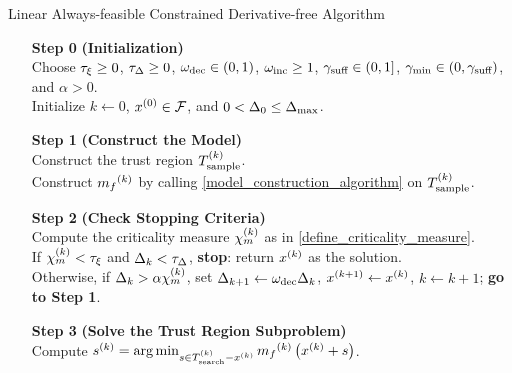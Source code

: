 \documentclass{article}
\begin{document}
{
\begin{fullwidth}[leftmargin=0in, rightmargin=0in, width=\linewidth-0.5in]
\begin{flushleft}

\begin{algorithm}[H]
    \caption{Linear Always-feasible Constrained Derivative-free Algorithm}
    \label{linearly_constrained_dfo_simple}
    \begin{itemize}
        \item[\textbf{Step 0}] \textbf{(Initialization)} \\
            Choose
            $\tau_{\xi}\ge 0$,
            $\tau_{\Delta} \ge 0$, 
            $\omega_{\text{dec}} \in (0,1)$, 
            $\omega_{\text{inc}} \ge 1$,  
            $ \gamma_{\textrm{suff}} \in (0,1]$, 
            $\gamma_{\textrm{min}} \in (0,\gamma_{\textrm{suff}})$,
			and $\alpha > 0$. \\
            Initialize
            $k\gets 0$,
            $x^{(0)} \in {\mathcal F}$,
            and $0 < \Delta_0 \le {\Delta_{\textrm{max}}}$.
            
        \item[\textbf{Step 1}] \textbf{(Construct the Model)} \\
           Construct the trust region ${T_{\text{sample}}^{(k)}}$. \\
           Construct ${{m}_f}^{(k)}$ by calling \cref{model_construction_algorithm} on ${T_{\text{sample}}^{(k)}}$.
        
        \item[\textbf{Step 2}] \textbf{(Check Stopping Criteria)} \\
            Compute the criticality measure ${\chi_m^{(k)}}$ as in \cref{define_criticality_measure}. \\
            If $ {\chi_m^{(k)}} < \tau_{\xi} $ and $\Delta_k <\tau_{\Delta}$,  {\bf stop}: return $x^{(k)}$ as the solution.   \\
            Otherwise, if $\Delta_k > \alpha {\chi_m^{(k)}}$,   
            set 
                $\Delta_{k+1} \gets \omega_{\text{dec}}\Delta_k$, 
                ${{x}^{(k+1)}} \gets x^{(k)}$,
                $k \gets k+1$; {\bf go to Step 1}.
           
        
        \item[\textbf{Step 3}] \textbf{(Solve the Trust Region Subproblem)} \\
            Compute ${{s}^{(k)}} = \operatorname*{arg\,min}_{s \in {T_{\text{search}}^{(k)}} - x^{(k)}} {{m}_f}^{(k)}\left(x^{(k)} + s\right)$. 
            

\end{itemize}
\end{algorithm}
\end{flushleft}
\end{fullwidth}}
\end{document}
